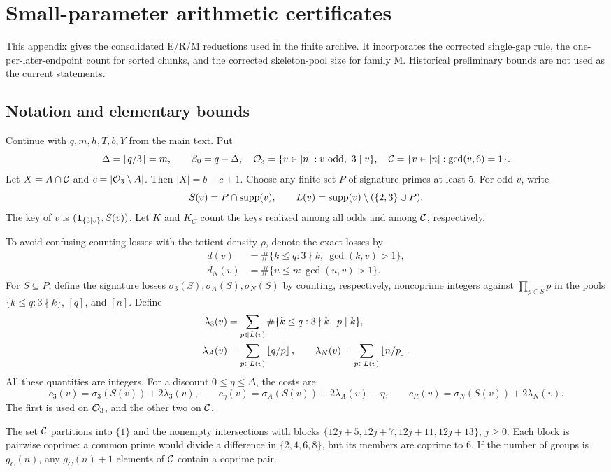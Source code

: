 \appendix
\section{Small-parameter arithmetic certificates}\label{app:small}
This appendix gives the consolidated E/R/M reductions used in the finite archive. It incorporates the corrected single-gap rule, the one-per-later-endpoint count for sorted chunks, and the corrected skeleton-pool size for family M. Historical preliminary bounds are not used as the current statements.

\subsection{Notation and elementary bounds}
Continue with $q,m,h,T,b,Y$ from the main text. Put
\[
 \Delta=\left\lfloor q/3\right\rfloor=m,\qquad \beta_0=q-\Delta,
 \quad\mathcal O_3=\{v\in[n]:v\text{ odd},\ 3\mid v\},
 \quad\mathcal C=\{v\in[n]:\gcd(v,6)=1\}.
\]
Let $X=A\cap\mathcal C$ and $c=|\mathcal O_3\setminus A|$. Then $|X|=b+c+1$.
Choose any finite set $P$ of signature primes at least $5$. For odd $v$, write
\[
 S(v)=P\cap\operatorname{supp}(v),\qquad
 L(v)=\operatorname{supp}(v)\setminus(\{2,3\}\cup P).
\]
The key of $v$ is $(\mathbf 1_{\{3\mid v\}},S(v))$. Let $K$ and $K_C$ count the keys realized among all odds and among $\mathcal C$, respectively.

To avoid confusing counting losses with the totient density $\rho$, denote the exact losses by
\begin{align*}
 d(v)&=\#\{k\le q:3\nmid k,\ \gcd(k,v)>1\},\\
 d_N(v)&=\#\{u\le n:\gcd(u,v)>1\}.
\end{align*}
For $S\subseteq P$, define the signature losses $\sigma_3(S),\sigma_A(S),\sigma_N(S)$ by counting, respectively, noncoprime integers against $\prod_{p\in S}p$ in the pools $\{k\le q:3\nmid k\}$, $[q]$, and $[n]$. Define
\begin{align*}
 \lambda_3(v)&=\sum_{p\in L(v)}\#\{k\le q:3\nmid k,\ p\mid k\},\\
 \lambda_A(v)&=\sum_{p\in L(v)}\left\lfloor q/p\right\rfloor,\qquad
 \lambda_N(v)=\sum_{p\in L(v)}\left\lfloor n/p\right\rfloor.
\end{align*}
All these quantities are integers. For a discount $0\le\eta\le\Delta$, the costs are
\[
 c_3(v)=\sigma_3(S(v))+2\lambda_3(v),\qquad
 c_\eta(v)=\sigma_A(S(v))+2\lambda_A(v)-\eta,
 \qquad c_R(v)=\sigma_N(S(v))+2\lambda_N(v).
\]
The first is used on $\mathcal O_3$, and the other two on $\mathcal C$.

The set $\mathcal C$ partitions into $\{1\}$ and the nonempty intersections with blocks
$\{12j+5,12j+7,12j+11,12j+13\}$, $j\ge0$. Each block is pairwise coprime: a common prime would divide a difference in $\{2,4,6,8\}$, but its members are coprime to $6$. If the number of groups is $g_C(n)$, any $g_C(n)+1$ elements of $\mathcal C$ contain a coprime pair.

